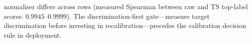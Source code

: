 \documentclass[review,12pt,nonatbib]{elsarticle}
\begin{document}
normaliser differs across rows (measured Spearman between raw and TS
top-label scores: $0.9945$--$0.9999$). The discrimination-first
gate---measure target discrimination before investing in
recalibration---precedes the calibration decision rule in
deployment.
\end{document}
